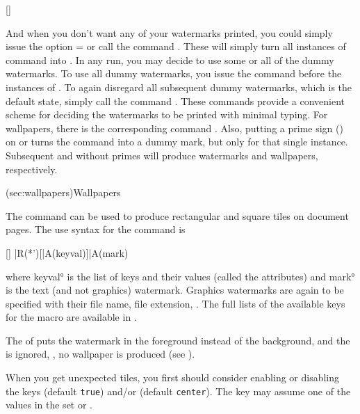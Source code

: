 \documentclass[
  use-a4-paper,
  use-10pt-font,
  final-version,
  use-UK-English,
  fancy-section-headings,
  frame-section-numbers,
  para-abstract-style,
  input-config-file,
  no-hyperref-messages,
  option-stack-limit=4,
  inputfile=true,
]{amltxdoc}
\begin{document}
[\dummywatermark]
\fxi*{\dummywatermark}

And when you don't want any of your watermarks printed, you could simply issue the option = or call the command \fxi{\DiscardAllWatermarks}. These will simply turn all instances of \fx{\newwatermark} command into \fx{\dummywatermark}. In any run, you may decide to use some or all of the dummy watermarks. To use all dummy watermarks, you issue the command \fxi{\UseDummyWatermarks} before the instances of \fx{\dummywatermark}. To again disregard all subsequent dummy watermarks, which is the default state, simply call the command \fxi{\DiscardDummyWatermarks}. These commands provide a convenient scheme for deciding the watermarks to be printed with minimal typing. For wallpapers, there is the corresponding command \fxi{\dummywallpaper}. Also, putting a prime sign (\Redprime) on \fx{\newwatermark} or \fx{\newwallpaper} turns the command into a dummy mark, but only for that single instance. Subsequent \fx{\newwatermark} and \fx{\newwallpaper} without primes will produce watermarks and wallpapers, respectively.


\docsection(sec:wallpapers){Wallpapers}


The command \fx{\newwallpaper} can be used to produce rectangular and square tiles on document pages. The use syntax for the command \fx{\newwallpaper} is

[\newwallpaper]
\newwallpaper|R(*')[|A(keyval)]{|A(mark)}
\fxi*{\newwallpaper}

where \ang{keyval} is the list of keys and their values (called the attributes) and \ang{mark} is the text (and not graphics) watermark. Graphics watermarks are again to be specified with their file name, file extension, \etcc. The full lists of the available keys for the macro \fx{\newwallpaper} are available in .

The \stform of \fx{\newwallpaper} puts the watermark in the foreground instead of the background, and the \pmform is ignored, \ie, no wallpaper is produced (see ).

When you get unexpected tiles, you first should consider enabling or disabling the keys  (default \texttt{true}) and/or  (default \texttt{center}). The key  may assume one of the values in the set  or .
\end{document}
